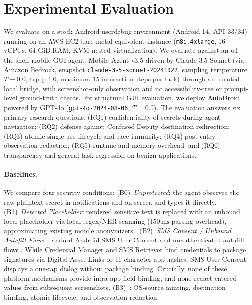 \section{Experimental Evaluation}
\label{sec:evidence}

We evaluate \SH{} on a stock-Android userdebug environment (Android 14, API 33/34) running on an AWS EC2 bare-metal-equivalent instance (\texttt{m8i.4xlarge}, 16 vCPUs, 64 GiB RAM, KVM nested virtualization). We evaluate against an off-the-shelf mobile GUI agent: Mobile-Agent v3.5 \cite{wang2024mobileagent,ye2025mobileagentv3} driven by Claude 3.5 Sonnet (via Amazon Bedrock, snapshot \texttt{claude-3-5-sonnet-20241022}, sampling temperature $T=0.0$, top-p $1.0$, maximum 15 interaction steps per task) through an isolated local bridge, with screenshot-only observation and no accessibility-tree or prompt-level ground-truth cheats. For structural GUI evaluation, we deploy AutoDroid \cite{wen2023autodroid} powered by GPT-4o (\texttt{gpt-4o-2024-08-06}, $T=0.0$). The evaluation answers six primary research questions: (RQ1) confidentiality of secrets during agent navigation; (RQ2) defense against Confused Deputy destination redirection; (RQ3) atomic single-use lifecycle and race immunity; (RQ4) post-entry observation redaction; (RQ5) runtime and memory overhead; and (RQ6) transparency and general-task regression on benign applications.

\paragraph{Baselines.} We compare four security conditions:
(B0)~\emph{Unprotected}: the agent observes the raw plaintext secret in notifications and on-screen and types it directly.
(B1)~\emph{Detected Placeholder}: rendered sensitive text is replaced with an unbound local placeholder via local regex/NER scanning ($150\,\text{ms}$ parsing overhead), approximating existing mobile anonymizers \cite{zhao2026anonymization}.
(B2)~\emph{SMS Consent / Unbound Autofill Flow}: standard Android SMS User Consent and unauthenticated autofill flows \cite{androidAutofillServices,androidCredentialManager,androidSmsConsent}. While Credential Manager and SMS Retriever bind credentials to package signatures via Digital Asset Links or 11-character app hashes, SMS User Consent displays a one-tap dialog without package binding. Crucially, none of these platform mechanisms provide intra-app field binding, and none redact entered values from subsequent screenshots.
(B3)~\emph{\SH}: OS-source minting, destination binding, atomic lifecycle, and observation redaction.

